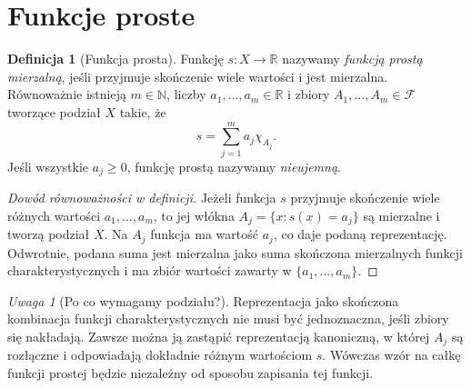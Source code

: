 \documentclass[11pt,a4paper,oneside]{book}
\numberwithin{equation}{chapter}
\theoremstyle{plain}
\theoremstyle{definition}
\newtheorem{definicja}[twierdzenie]{Definicja}
\theoremstyle{remark}
\newtheorem{uwaga}[twierdzenie]{Uwaga}
\begin{document}
\section{Funkcje proste}

\begin{definicja}[Funkcja prosta]
\label{def:simple-function}
Funkcję $s:X\to\mathbb R$ nazywamy
\emph{funkcją prostą mierzalną}, jeśli przyjmuje
skończenie wiele wartości i jest mierzalna.
Równoważnie istnieją $m\in\mathbb N$,
liczby $a_1,\ldots,a_m\in\mathbb R$ i zbiory
$A_1,\ldots,A_m\in\mathcal F$ tworzące podział $X$
takie, że
\[
s=\sum_{j=1}^m a_j\chi_{A_j}.
\]
Jeśli wszystkie $a_j\ge0$, funkcję prostą nazywamy
\emph{nieujemną}.
\end{definicja}

\begin{proof}[Dowód równoważności w definicji]
Jeżeli funkcja $s$ przyjmuje skończenie wiele różnych
wartości $a_1,\ldots,a_m$, to jej włókna
$A_j=\{x:s(x)=a_j\}$ są mierzalne i tworzą
podział $X$. Na $A_j$ funkcja ma wartość $a_j$,
co daje podaną reprezentację. Odwrotnie, podana suma
jest mierzalna jako suma skończona mierzalnych funkcji
charakterystycznych i ma zbiór wartości zawarty w
$\{a_1,\ldots,a_m\}$.
\end{proof}

\begin{uwaga}[Po co wymagamy podziału?]
Reprezentacja jako skończona kombinacja funkcji
charakterystycznych nie musi być jednoznaczna, jeśli
zbiory się nakładają. Zawsze można ją zastąpić
reprezentacją kanoniczną, w której $A_j$ są rozłączne
i odpowiadają dokładnie różnym wartościom $s$.
Wówczas wzór na całkę funkcji prostej będzie
niezależny od sposobu zapisania tej funkcji.
\end{uwaga}
\end{document}
